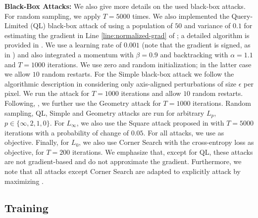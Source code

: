 \textbf{Black-Box Attacks:}
%
We also give more details on the used black-box attacks. For random sampling, we apply  $T = 5000$ times. We also implemented the Query-Limited (QL) black-box attack of \cite{IlyasICML2018} using a population of $50$ and variance of $0.1$ for estimating the gradient in Line \ref{line:normalized-grad} of ; a detailed algorithm is provided in \citep{IlyasICML2018}. We use a learning rate of $0.001$ (note that the gradient is signed, as in \citep{MadryICLR2018}) and also integrated a momentum with $\beta = 0.9$ and backtracking with $\alpha = 1.1$ and $T = 1000$ iterations. We use zero and random initialization; in the latter case we allow $10$ random restarts. For the Simple black-box attack we follow the algorithmic description in \citep{NarodytskaCVPRWORK2017} considering only axis-aligned perturbations of size $\epsilon$ per pixel. We run the attack for $T = 1000$ iterations and allow $10$ random restarts. Following, \cite{KhouryARXIV2018}, we further use the Geometry attack for $T = 1000$ iterations. Random sampling, QL, Simple and Geometry attacks are run for arbitrary $L_p$, $p \in \{\infty, 2, 1, 0\}$. For $L_\infty$, we also use the Square attack proposed in \citep{AndriushchenkoARXIV2019} with $T = 5000$ iterations with a probability of change of $0.05$. For all attacks, we use  as objective. Finally, for $L_0$, we also use Corner Search \cite{CroceICCV2019} with the cross-entropy loss as objective, for $T = 200$ iterations. We emphasize that, except for QL, these attacks are not gradient-based and do not approximate the gradient. Furthermore, we note that all attacks except Corner Search are adapted to explicitly attack \ConfTrain by maximizing .

\subsection{Training}
\label{subsec:supp-experiments-training}

